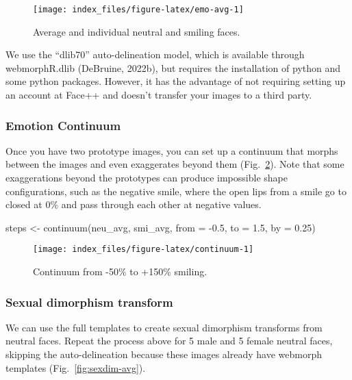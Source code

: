 \documentclass[
  doc,floatsintext]{apa6}
\newenvironment{Shaded}{\begin{snugshade}}{\end{snugshade}}
\newcommand{\AttributeTok}[1]{\textcolor[rgb]{0.77,0.63,0.00}{#1}}
\newcommand{\FloatTok}[1]{\textcolor[rgb]{0.00,0.00,0.81}{#1}}
\newcommand{\FunctionTok}[1]{\textcolor[rgb]{0.00,0.00,0.00}{#1}}
\newcommand{\NormalTok}[1]{#1}
\newcommand{\OtherTok}[1]{\textcolor[rgb]{0.56,0.35,0.01}{#1}}
\newcommand{\SpecialCharTok}[1]{\textcolor[rgb]{0.00,0.00,0.00}{#1}}
\begin{document}
\begin{figure}
\texttt{[image: index\_files/figure-latex/emo-avg-1]} \caption{Average and individual neutral and smiling faces.}\label{fig:emo-avg}
\end{figure}

We use the ``dlib70'' auto-delineation model, which is available through webmorphR.dlib (DeBruine, 2022b), but requires the installation of python and some python packages. However, it has the advantage of not requiring setting up an account at Face++ and doesn't transfer your images to a third party.

\hypertarget{emotion-continuum}{%
\subsubsection{Emotion Continuum}\label{emotion-continuum}}

Once you have two prototype images, you can set up a continuum that morphs between the images and even exaggerates beyond them (Fig.~\ref{fig:continuum}). Note that some exaggerations beyond the prototypes can produce impossible shape configurations, such as the negative smile, where the open lips from a smile go to closed at 0\% and pass through each other at negative values.

\begin{Shaded}
\begin{Highlighting}[]
\NormalTok{steps }\OtherTok{\textless{}{-}} \FunctionTok{continuum}\NormalTok{(neu\_avg, smi\_avg, }\AttributeTok{from =} \SpecialCharTok{{-}}\FloatTok{0.5}\NormalTok{, }\AttributeTok{to =} \FloatTok{1.5}\NormalTok{, }\AttributeTok{by =} \FloatTok{0.25}\NormalTok{)}
\end{Highlighting}
\end{Shaded}



\begin{figure}
\texttt{[image: index\_files/figure-latex/continuum-1]} \caption{Continuum from -50\% to +150\% smiling.}\label{fig:continuum}
\end{figure}

\hypertarget{sexual-dimorphism-transform}{%
\subsubsection{Sexual dimorphism transform}\label{sexual-dimorphism-transform}}

We can use the full templates to create sexual dimorphism transforms from neutral faces. Repeat the process above for 5 male and 5 female neutral faces, skipping the auto-delineation because these images already have webmorph templates (Fig.~\ref{fig:sexdim-avg}).
\end{document}
